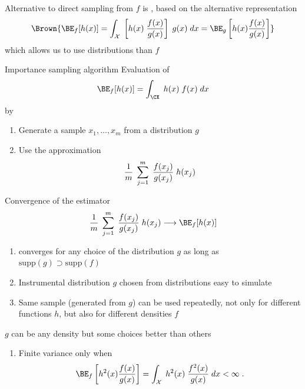 \begin{slide}
\medskip\pause
Alternative to direct sampling from $f$ is {},
based on the alternative representation 
$$\Brown{
\BE_f[h(x)]  = \int_{\cal{X}} \; \left[ h(x) \; {f(x)\over g(x)} \right]\; g(x) \; dx
= \BE_g\left[ h(x)\frac{f(x)}{g(x)}\right]
}$$
which allows us to use  distributions than $f$

\end{slide}\begin{slide}
\begin{block}{Importance sampling algorithm}
Evaluation of
$$
  \BE_f[h(x)] = \int_{\CX} \; h(x) \; f(x) \; dx
$$
by 
{\sf \begin{enumerate}
\item Generate a sample $x_1,\ldots,x_m$ from a distribution $g$
\item Use the approximation
$$
 {1\over m}\; \sum_{j=1}^m\; {f(x_j)\over g(x_j)}\; h(x_j)
$$
\end{enumerate}
}\end{block}

\end{slide}\begin{slide}

Convergence of the estimator
$$
{1\over m}\; \sum_{j=1}^m\; {f(x_j)\over g(x_j)}\;h(x_j)
\longrightarrow  \BE_f[h(x)]
$$

\begin{enumerate}
\item converges for any choice
of the distribution $g$ as long as $\mathrm{ supp}(g) \supset \mathrm{ supp}(f)$

\pause
\item Instrumental distribution 
$g$ chosen from distributions easy to simulate

\pause
\item Same sample (generated from $g$) 
can be used repeatedly, not only for different functions 
$h$, but also for different densities $f$
\end{enumerate}

\end{slide}\begin{slide}
$g$ can be any density but some choices better than others

\begin{enumerate}
\item Finite variance only when 
$$
\BE_f \left[ h^2(x)  \frac{f(x)}{g(x)} \right] = \int_{\cal X}\; h^2(x)\; 
\frac{f^2(x)}{g(x)} \; dx < \infty \; .  
$$


\end{enumerate}
\end{slide}
